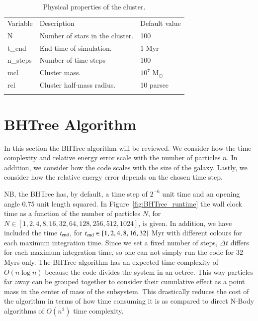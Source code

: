 \documentclass{aa}
\newcommand{\Sun}[0]{\ensuremath{_{\odot}}}
\begin{document}
   \begin{table}
      \caption[]{Physical properties of the cluster.}
         \label{tab:properties}
         \begin{tabular}{lll}
            \hline
            \noalign{\smallskip}
            Variable  & Description &  Default value \\
            \noalign{\smallskip}
            \hline
            \noalign{\smallskip}
	    N & Number of stars in the cluster. & 100  \\
	    t\_end & End time of simulation. & 1 Myr \\
	    n\_steps & Number of time steps & 100 \\
	    mcl & Cluster mass. & $10^7$ M\Sun \\
	    rcl & Cluster half-mass radius. & 10 parsec \\
            \noalign{\smallskip}
            \hline
         \end{tabular}
   \end{table}
   
\section{BHTree Algorithm} \label{sec:BHTree}
In this section the BHTree algorithm will be reviewed. We consider how the time complexity and relative energy error scale with the number of particles $n$. In addition, we consider how the code scales with the size of the galaxy. Lastly, we consider how the relative energy error depends on the chosen time step.

NB, the BHTree has, by default, a time step of $2^{-6}$ unit time and an opening angle 0.75 unit length squared. In Figure~\ref{fig:BHTree_runtime} the wall clock time as a function of the number of particles $N$, for $N \in [1, 2, 4, 8, 16, 32, 64, 128, 256, 512, 1024]$, is given. In addition, we have included the time $t_{\rm end}$, for $t_{\rm end} \in [1, 2, 4, 8, 16, 32]$ Myr with different colours for each maximum integration time. Since we set a fixed number of steps, $\Delta t$ differs for each maximum integration time, so one can not simply run the code for 32 Myrs only.
  The BHTree algorithm has an expected time-complexity of $O(n \log n)$ because the code divides the system in an octree. This way particles far away can be grouped together to consider their cumulative effect as a point mass in the center of mass of the subsystem. This drastically reduces the cost of the algorithm in terms of how time consuming it is as compared to direct N-Body algorithms of $O(n^2)$ time complexity. 
\end{document}
